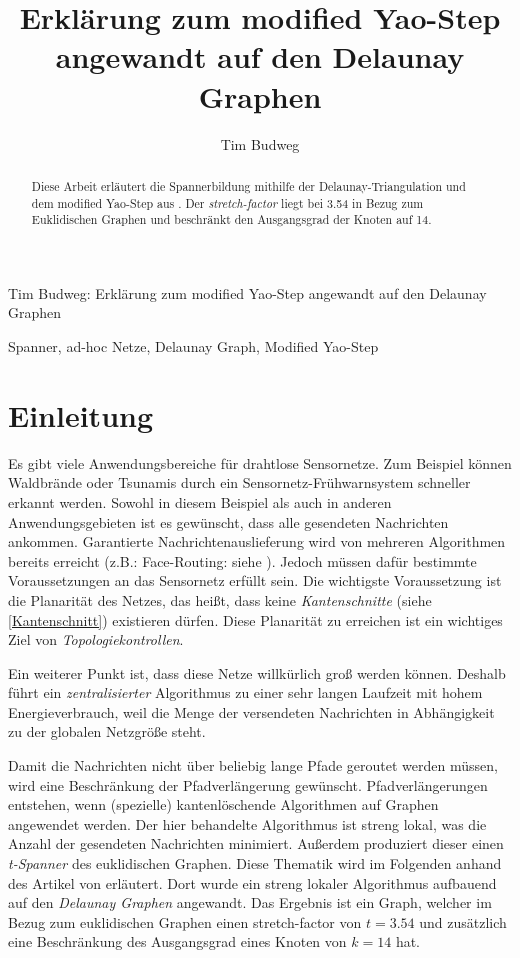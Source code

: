 \documentclass[a4paper,twoside]{IEEEtran}
\newcommand{\seminarteilnehmer}{Tim Budweg}
\newcommand{\seminartitel}{Erklärung zum modified Yao-Step angewandt auf den Delaunay Graphen}
\begin{document}
\title{\seminartitel}
\author{\seminarteilnehmer}

%
{\seminarteilnehmer: \seminartitel}


\maketitle

\begin{abstract}
\space Diese Arbeit erläutert die Spannerbildung mithilfe der Delaunay-Triangulation und dem modified Yao-Step aus \cite{kanj}. Der \emph{stretch-factor} liegt bei 3.54 in Bezug zum Euklidischen Graphen und beschränkt den Ausgangsgrad der Knoten auf 14.
\end{abstract}

\begin{IEEEkeywords}
\space Spanner, ad-hoc Netze, Delaunay Graph, Modified Yao-Step
\end{IEEEkeywords}


\section{Einleitung}
Es gibt viele Anwendungsbereiche für drahtlose Sensornetze. 
Zum Beispiel können Waldbrände oder Tsunamis durch ein Sensornetz-Frühwarnsystem schneller erkannt werden. 
Sowohl in diesem Beispiel als auch in anderen Anwendungsgebieten ist es gewünscht, dass alle gesendeten Nachrichten ankommen.
Garantierte Nachrichtenauslieferung wird von mehreren Algorithmen bereits erreicht (z.B.: Face-Routing: siehe \cite{FaceRouting}).
Jedoch müssen dafür bestimmte Voraussetzungen an das Sensornetz erfüllt sein. 
Die wichtigste Voraussetzung ist die Planarität des Netzes, das heißt, dass keine \emph{Kantenschnitte} (siehe \ref{Kantenschnitt}) existieren dürfen. 
Diese Planarität zu erreichen ist ein wichtiges Ziel von \emph{Topologiekontrollen}.

Ein weiterer Punkt ist, dass diese Netze willkürlich groß werden können.
Deshalb führt ein \emph{zentralisierter} Algorithmus zu einer sehr langen Laufzeit mit hohem Energieverbrauch, weil die Menge der versendeten Nachrichten in Abhängigkeit zu der globalen Netzgröße steht.

Damit die Nachrichten nicht über beliebig lange Pfade geroutet werden müssen, wird eine Beschränkung der Pfadverlängerung gewünscht. 
Pfadverlängerungen entstehen, wenn (spezielle) kantenlöschende Algorithmen auf Graphen angewendet werden.
Der hier behandelte Algorithmus ist streng lokal, was die Anzahl der gesendeten Nachrichten minimiert.
Außerdem produziert dieser einen \emph{t-Spanner} des euklidischen Graphen.
Diese Thematik wird im Folgenden anhand des Artikel von \cite{kanj} erläutert.
Dort wurde ein streng lokaler Algorithmus aufbauend auf den \emph{Delaunay Graphen} angewandt.
Das Ergebnis ist ein Graph, welcher im Bezug zum euklidischen Graphen einen stretch-factor von $t=3.54 $ und zusätzlich eine Beschränkung des Ausgangsgrad eines Knoten von $k=14 $ hat.
\end{document}
